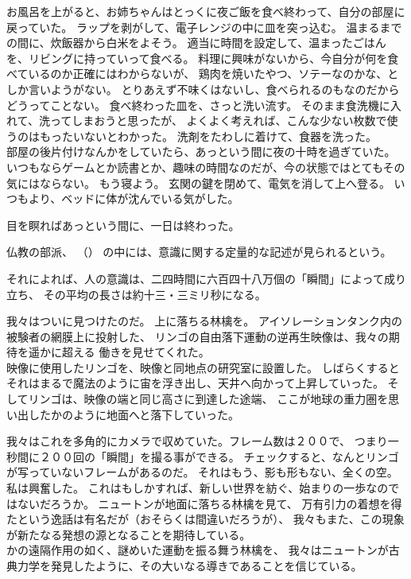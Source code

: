 \documentclass[../IHMain]{subfiles}
\begin{document}
お風呂を上がると、お姉ちゃんはとっくに夜ご飯を食べ終わって、自分の部屋に戻っていた。
ラップを剥がして、電子レンジの中に皿を突っ込む。
温まるまでの間に、炊飯器から白米をよそう。
適当に時間を設定して、温まったごはんを、リビングに持っていって食べる。
料理に興味がないから、今自分が何を食べているのか正確にはわからないが、
鶏肉を焼いたやつ、ソテーなのかな、としか言いようがない。
とりあえず不味くはないし、食べられるのもなのだからどうってことない。
食べ終わった皿を、さっと洗い流す。
そのまま食洗機に入れて、洗ってしまおうと思ったが、
よくよく考えれば、こんな少ない枚数で使うのはもったいないとわかった。
洗剤をたわしに着けて、食器を洗った。\\

部屋の後片付けなんかをしていたら、あっという間に夜の十時を過ぎていた。
いつもならゲームとか読書とか、趣味の時間なのだが、今の状態ではとてもその気にはならない。
もう寝よう。
玄関の鍵を閉めて、電気を消して上へ登る。
いつもより、ベッドに体が沈んでいる気がした。

目を瞑ればあっという間に、一日は終わった。

\newpage
{\onecolumn
\markboth{}{}
\begin{center}
\end{center}

仏教の部派、
（）
の中には、意識に関する定量的な記述が見られるという。

それによれば、人の意識は、二四時間に六百四十八万個の「瞬間」によって成り立ち、
その平均の長さは約十三・三ミリ秒になる。
\begin{center}
\end{center}}

我々はついに見つけたのだ。
上に落ちる林檎を。
アイソレーションタンク内の被験者の網膜上に投射した、
リンゴの自由落下運動の逆再生映像は、我々の期待を遥かに超える
働きを見せてくれた。\\

映像に使用したリンゴを、映像と同地点の研究室に設置した。
しばらくするとそれはまるで魔法のように宙を浮き出し、天井へ向かって上昇していった。
そしてリンゴは、映像の端と同じ高さに到達した途端、
ここが地球の重力圏を思い出したかのように地面へと落下していった。

我々はこれを多角的にカメラで収めていた。フレーム数は２００で、
つまり一秒間に２００回の「瞬間」を撮る事ができる。
チェックすると、なんとリンゴが写っていないフレームがあるのだ。
それはもう、影も形もない、全くの空。
私は興奮した。
これはもしかすれば、新しい世界を紡ぐ、始まりの一歩なのではないだろうか。
ニュートンが地面に落ちる林檎を見て、
万有引力の着想を得たという逸話は有名だが（おそらくは間違いだろうが）、
我々もまた、この現象が新たなる発想の源となることを期待している。\\

かの遠隔作用の如く、謎めいた運動を振る舞う林檎を、
我々はニュートンが古典力学を発見したように、その大いなる導きであることを信じている。
\twocolumn
\end{document}
